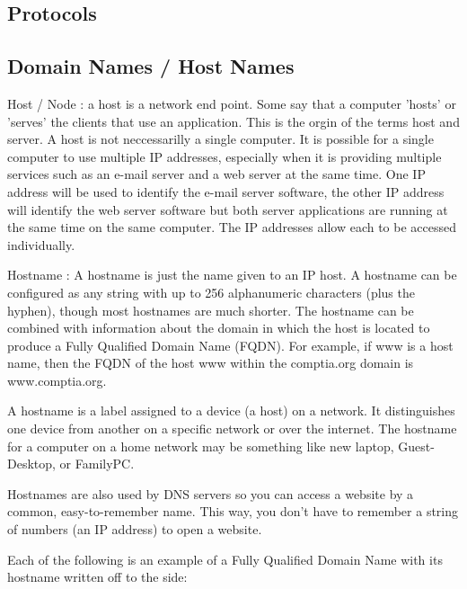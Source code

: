 
\subsection{Protocols}
\label{ssec:protocols}



\subsectionend

\subsection{Domain Names / Host Names}
\label{ssec:domain_names}

Host / Node : a host is a network end point. Some say that a computer 'hosts' or
'serves' the clients that use an application. This is the orgin of the terms
host and server. A host is not neccessarilly a single computer. It is possible
for a single computer to use multiple IP addresses, especially when it is
providing multiple services such as an e-mail server and a web server at the
same time. One IP address will be used to identify the e-mail server software,
the other IP address will identify the web server software but both server
applications are running at the same time on the same computer. The IP addresses
allow each to be accessed individually.


Hostname : A hostname is just the name given to an IP host. A hostname can be
configured as any string with up to 256 alphanumeric characters (plus the
hyphen), though most hostnames are much shorter. The hostname can be combined
with information about the domain in which the host is located to produce a
Fully Qualified Domain Name (FQDN). For example, if www is a host name, then the
FQDN of the host www within the comptia.org domain is www.comptia.org. 

A hostname is a label assigned to a device (a host) on a network. It
distinguishes one device from another on a specific network or over the
internet. The hostname for a computer on a home network may be something like
new laptop, Guest-Desktop, or FamilyPC.

Hostnames are also used by DNS servers so you can access a website by a common,
easy-to-remember name. This way, you don't have to remember a string of numbers
(an IP address) to open a website.

Each of the following is an example of a Fully Qualified Domain Name with its
hostname written off to the side:

